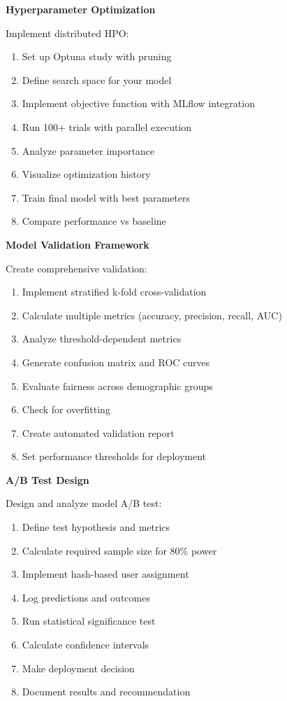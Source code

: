 \begin{exercise}
\textbf{Hyperparameter Optimization}

Implement distributed HPO:

\begin{enumerate}
    \item Set up Optuna study with pruning
    \item Define search space for your model
    \item Implement objective function with MLflow integration
    \item Run 100+ trials with parallel execution
    \item Analyze parameter importance
    \item Visualize optimization history
    \item Train final model with best parameters
    \item Compare performance vs baseline
\end{enumerate}
\end{exercise}

\begin{exercise}
\textbf{Model Validation Framework}

Create comprehensive validation:

\begin{enumerate}
    \item Implement stratified k-fold cross-validation
    \item Calculate multiple metrics (accuracy, precision, recall, AUC)
    \item Analyze threshold-dependent metrics
    \item Generate confusion matrix and ROC curves
    \item Evaluate fairness across demographic groups
    \item Check for overfitting
    \item Create automated validation report
    \item Set performance thresholds for deployment
\end{enumerate}
\end{exercise}

\begin{exercise}
\textbf{A/B Test Design}

Design and analyze model A/B test:

\begin{enumerate}
    \item Define test hypothesis and metrics
    \item Calculate required sample size for 80\% power
    \item Implement hash-based user assignment
    \item Log predictions and outcomes
    \item Run statistical significance test
    \item Calculate confidence intervals
    \item Make deployment decision
    \item Document results and recommendation
\end{enumerate}
\end{exercise}

